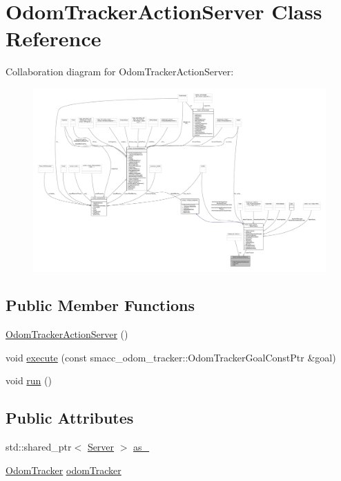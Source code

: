 \hypertarget{classOdomTrackerActionServer}{}\section{Odom\+Tracker\+Action\+Server Class Reference}
\label{classOdomTrackerActionServer}


Collaboration diagram for Odom\+Tracker\+Action\+Server\+:
\nopagebreak
\begin{figure}[H]
\begin{center}
\leavevmode
\includegraphics[width=350pt]{classOdomTrackerActionServer__coll__graph}
\end{center}
\end{figure}
\subsection*{Public Member Functions}
\begin{DoxyCompactItemize}
\item 
\hyperlink{classOdomTrackerActionServer_a98b7fba6da04e1afcf1000f937be7fef}{Odom\+Tracker\+Action\+Server} ()
\item 
void \hyperlink{classOdomTrackerActionServer_af8a72e60dfa1b6224d5c0a9cc9ae68a8}{execute} (const smacc\+\_\+odom\+\_\+tracker\+::\+Odom\+Tracker\+Goal\+Const\+Ptr \&goal)
\item 
void \hyperlink{classOdomTrackerActionServer_a8ab6984c7383949a048d72437e9f79d3}{run} ()
\end{DoxyCompactItemize}
\subsection*{Public Attributes}
\begin{DoxyCompactItemize}
\item 
std\+::shared\+\_\+ptr$<$ \hyperlink{odom__tracker__node_8cpp_a287066ed24118c12919f0d8ed7e010ff}{Server} $>$ \hyperlink{classOdomTrackerActionServer_a28bed1d95003d837b2b47053dbc66878}{as\+\_\+}
\item 
\hyperlink{classsmacc__odom__tracker_1_1OdomTracker}{Odom\+Tracker} \hyperlink{classOdomTrackerActionServer_a3e5c4328d3206fbd2fd2708f0aefe651}{odom\+Tracker}
\end{DoxyCompactItemize}


